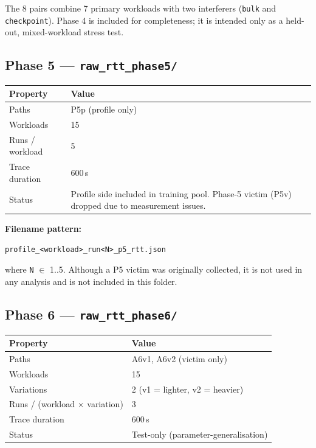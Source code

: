 \documentclass[11pt,a4paper]{article}
\begin{document}
The 8 pairs combine 7 primary workloads with two interferers (\texttt{bulk}
and \texttt{checkpoint}). Phase 4 is included for completeness; it is intended
only as a held-out, mixed-workload stress test.

\subsection{Phase 5 --- \texttt{raw\_rtt\_phase5/}}

\begin{tabular}{@{}lp{10cm}@{}}
\toprule
\textbf{Property} & \textbf{Value} \\
\midrule
Paths            & P5p (profile only) \\
Workloads        & 15 \\
Runs / workload  & 5 \\
Trace duration   & 600\,s \\
Status           & Profile side included in training pool. Phase-5 victim (P5v) dropped due to measurement issues. \\
\bottomrule
\end{tabular}

\textbf{Filename pattern:}
\begin{lstlisting}
profile_<workload>_run<N>_p5_rtt.json
\end{lstlisting}
where \texttt{N} $\in$ 1..5. Although a P5 victim was originally collected,
it is not used in any analysis and is not included in this folder.

\subsection{Phase 6 --- \texttt{raw\_rtt\_phase6/}}

\begin{tabular}{@{}ll@{}}
\toprule
\textbf{Property} & \textbf{Value} \\
\midrule
Paths                          & A6v1, A6v2 (victim only) \\
Workloads                      & 15 \\
Variations                     & 2 (v1 = lighter, v2 = heavier) \\
Runs / (workload $\times$ variation) & 3 \\
Trace duration                 & 600\,s \\
Status                         & Test-only (parameter-generalisation) \\
\bottomrule
\end{tabular}
\end{document}
